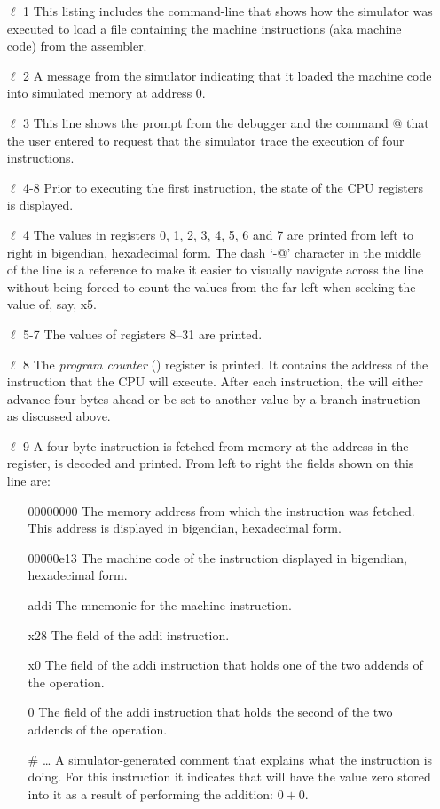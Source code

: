 \begin{itemize}
\item [$\ell$ 1] This listing includes the command-line that shows how the simulator
	was executed to load a file containing the machine instructions (aka
	machine code) from the assembler.
\item [$\ell$ 2] A message from the simulator indicating that it loaded the machine
	code into simulated memory at address 0.
\item [$\ell$ 3] This line shows the prompt from the debugger and the command
	@ that the user entered to request that the simulator trace 
	the execution of four instructions.
\item [$\ell$ 4-8] Prior to executing the first instruction, the state of the
	CPU registers is displayed.  
\item [$\ell$ 4] The values in registers 0, 1, 2, 3, 4, 5, 6 and 7 are printed 
	from left to right in \gls{bigendian}, \gls{hexadecimal} form.  
	The dash `\verb@-@' character in the middle of the line is a reference 
	to make it easier to visually navigate across the line without being
	forced to count the values from the far left when seeking the value 
	of, say, x5.
\item [$\ell$ 5-7] The values of registers 8--31 are printed.
\item [$\ell$ 8] The {\em program counter} () register is printed.  
	It contains the address of the instruction that the CPU will execute.  
	After each instruction, the  will either advance four bytes 
	ahead or be set to another value by a branch instruction as discussed above.
\item [$\ell$ 9] A four-byte instruction is fetched from memory at the address
	in the  register, is decoded and printed.  From left to right
	the fields shown on this line are:

	\begin{itemize}

	\item [00000000] The memory address from which the instruction was
		fetched.  This address is displayed in \gls{bigendian},
		\gls{hexadecimal} form.
	\item [00000e13] The machine code of the instruction displayed in 
		\gls{bigendian}, \gls{hexadecimal} form.
	\item [addi] The mnemonic for the machine instruction.
	\item [x28] The  field of the addi instruction.  
	\item [x0] The  field of the addi instruction that
		holds one of the two addends of the operation.
	\item [0] The  field of the addi instruction that
		holds the second of the two addends of the operation.
	\item [\# \ldots] A simulator-generated comment that explains
		what the instruction is doing.  For this instruction it indicates 
		that  will have the value zero stored into it as a result 
		of performing the addition: $0+0$.
	\end{itemize}


\end{itemize}
